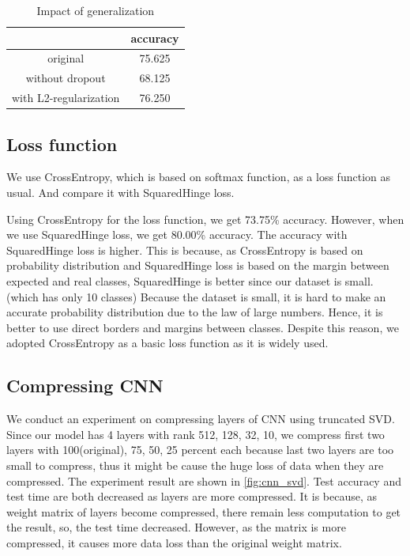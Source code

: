 \begin{table}[htbp]
	\centering
	\setlength{\tabcolsep}{10pt}
	\renewcommand{\arraystretch}{1.5}
	\begin{tabular}{|c||c|}
	\hline
	& accuracy  \\ \hline\hline
	original & 75.625  \\ \hline
	without dropout & 68.125  \\ \hline
	with L2-regularization & 76.250  \\ \hline
	\end{tabular}
        \caption{Impact of generalization}
	\label{table:generalization}
\end{table}
	

\subsection{Loss function}
We use CrossEntropy, which is based on softmax function, as a loss function as usual. And compare it with SquaredHinge loss.

Using CrossEntropy for the loss function, we get 73.75\% accuracy. However, when we use SquaredHinge loss, we get 80.00\% accuracy. The accuracy with SquaredHinge loss is higher. This is because, as CrossEntropy is based on probability distribution and SquaredHinge loss is based on the margin between expected and real classes, SquaredHinge is better since our dataset is small. (which has only 10 classes) Because the dataset is small, it is hard to make an accurate probability distribution due to the law of large numbers. Hence, it is better to use direct borders and margins between classes.
Despite this reason, we adopted CrossEntropy as a basic loss function as it is widely used.

\subsection{Compressing CNN}
We conduct an experiment on compressing layers of CNN using truncated SVD. Since our model has 4 layers with rank 512, 128, 32, 10, we compress first two layers with 100(original), 75, 50, 25 percent each because last two layers are too small to compress, thus it might be cause the huge loss of data when they are compressed. The experiment result are shown in \cref{fig:cnn_svd}. Test accuracy and test time are both decreased as layers are more compressed. It is because, as weight matrix of layers become compressed, there remain less computation to get the result, so, the test time decreased. However, as the matrix is more compressed, it causes more data loss than the original weight matrix.

